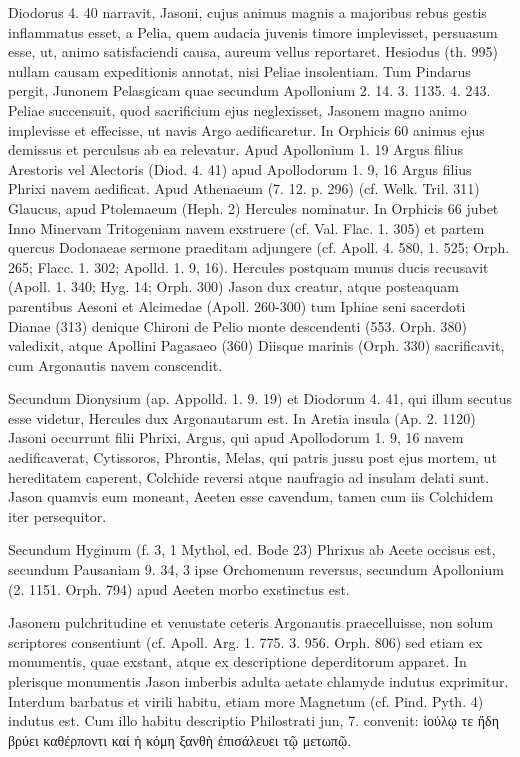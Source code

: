 \documentclass[a4paper, 11pt, oneside, polutonikogreek, german]{article}
\begin{document}
Diodorus 4. 40 narravit, Jasoni, cujus animus magnis a majoribus rebus gestis inflammatus esset, a Pelia, quem audacia juvenis timore implevisset, persuasum esse, ut, animo satisfaciendi causa, aureum vellus reportaret. Hesiodus (th. 995) nullam causam expeditionis annotat, nisi Peliae insolentiam. Tum Pindarus pergit, Junonem Pelasgicam quae secundum Apollonium 2. 14. 3. 1135. 4. 243. Peliae succensuit, quod sacrificium ejus neglexisset, Jasonem magno animo implevisse et effecisse, ut navis Argo aedificaretur. In Orphicis 60 animus ejus demissus et perculsus ab ea relevatur. Apud Apollonium 1. 19 Argus filius Arestoris vel Alectoris (Diod. 4. 41) apud Apollodorum 1. 9, 16 Argus filius Phrixi navem aedificat. Apud Athenaeum (7. 12. p. 296) (cf. Welk. Tril. 311) Glaucus, apud Ptolemaeum (Heph. 2) Hercules nominatur. In Orphicis 66 jubet Inno Minervam Tritogeniam navem exstruere (cf. Val. Flac. 1. 305) et partem quercus Dodonaeae sermone praeditam adjungere (cf. Apoll. 4. 580, 1. 525; Orph. 265; Flacc. 1. 302; Apolld. 1. 9, 16). Hercules postquam munus ducis recusavit (Apoll. 1. 340; Hyg. 14; Orph. 300) Jason dux creatur, atque posteaquam parentibus Aesoni et Alcimedae (Apoll. 260-300) tum Iphiae seni sacerdoti Dianae (313) denique Chironi de Pelio monte descendenti (553. Orph. 380) valedixit, atque Apollini Pagasaeo (360) Diisque marinis (Orph. 330) sacrificavit, cum Argonautis navem conscendit.

Secundum Dionysium (ap. Appolld. 1. 9. 19) et Diodorum 4. 41, qui illum secutus esse videtur, Hercules dux Argonautarum est. In Aretia insula (Ap. 2. 1120) Jasoni occurrunt filii Phrixi, Argus, qui apud Apollodorum 1. 9, 16 navem aedificaverat, Cytissoros, Phrontis, Melas, qui patris jussu post ejus mortem, ut hereditatem caperent, Colchide reversi atque naufragio ad insulam delati sunt. Jason quamvis eum moneant, Aeeten esse cavendum, tamen cum iis Colchidem iter persequitor.

Secundum Hyginum (f. 3, 1 Mythol, ed. Bode 23) Phrixus ab Aeete occisus est, secundum Pausaniam 9. 34, 3 ipse Orchomenum reversus, secundum Apollonium (2. 1151. Orph. 794) apud Aeeten morbo exstinctus est.

Jasonem pulchritudine et venustate ceteris Argonautis praecelluisse, non solum scriptores consentiunt (cf. Apoll. Arg. 1. 775. 3. 956. Orph. 806) sed etiam ex monumentis, quae exstant, atque ex descriptione deperditorum apparet. In plerisque monumentis Jason imberbis adulta aetate chlamyde indutus exprimitur. Interdum barbatus et virili habitu, etiam more Magnetum (cf. Pind. Pyth. 4) indutus est. Cum illo habitu descriptio Philostrati jun, 7. convenit: ἰούλῳ τε ἤδη βρύει καθέρποντι καί ἡ κόμη ξανθὴ ἐπισάλευει τῷ μετωπῷ.
\end{document}
